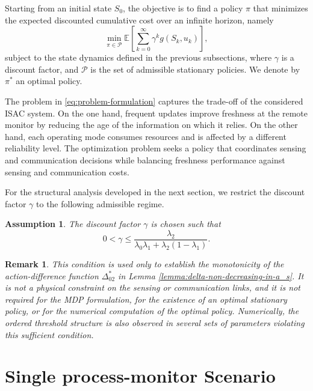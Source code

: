 \documentclass[letterpaper,journal]{IEEEtran}
\newtheorem*{assumption}{Assumption}
\newtheorem*{remark}{Remark}
\begin{document}
Starting from an initial state $S_0$, the objective is to find a policy $\pi$ that minimizes the expected discounted cumulative cost over an infinite horizon, namely
\begin{equation}
	\min_{\pi \in \mathcal P} \mathbb{E}\left[\sum_{k=0}^{\infty} \gamma^k g(S_k,u_k)\right],
	\label{eq:problem-formulation}
\end{equation}
subject to the state dynamics defined in the previous subsections, where $\gamma$ is a discount factor, and $\mathcal P$ is the set of admissible stationary policies. We denote by $\pi^*$ an optimal policy.

The problem in \eqref{eq:problem-formulation} captures the trade-off of the considered ISAC system. On the one hand, frequent updates improve freshness at the remote monitor by reducing the age of the information on which it relies. On the other hand, each operating mode consumes resources and is affected by a different reliability level. The optimization problem seeks a policy that coordinates sensing and communication decisions while balancing freshness performance against sensing and communication costs.

For the structural analysis developed in the next section, we restrict the discount factor $\gamma$ to the following admissible regime.

\begin{assumption}\label{ass:admissible-gamma}
The discount factor $\gamma$ is chosen such that
\begin{equation}\label{eq:parameters-assumption}
0 < \gamma \leq \frac{\lambda_2}{\lambda_0\lambda_1+\lambda_2(1-\lambda_1)}.
\end{equation}
\end{assumption}

\begin{remark}
This condition is used only to establish the monotonicity of the action-difference function $\Delta_{02}^\ast$ in Lemma \ref{lemma:delta-non-decreasing-in-a_s}. It is not a physical constraint on the sensing or communication links, and it is not required for the MDP formulation, for the existence of an optimal stationary policy, or for the numerical computation of the optimal policy. Numerically, the ordered threshold structure is also observed in several sets of parameters violating this sufficient
condition.

\end{remark}


\section{Single process-monitor Scenario}\label{sec:single-source-scenario}
\end{document}
